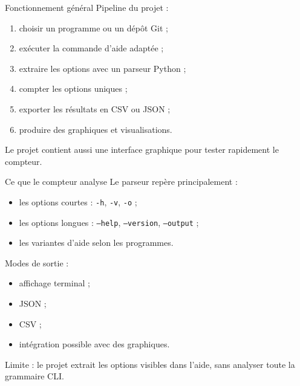 \documentclass[10pt,aspectratio=169]{beamer}
\begin{document}
\begin{frame}{Fonctionnement général}
  Pipeline du projet :

  \begin{enumerate}
    \item choisir un programme ou un dépôt Git ;
    \item exécuter la commande d'aide adaptée ;
    \item extraire les options avec un parseur Python ;
    \item compter les options uniques ;
    \item exporter les résultats en CSV ou JSON ;
    \item produire des graphiques et visualisations.
  \end{enumerate}

  \vspace{0.3cm}
  Le projet contient aussi une interface graphique pour tester rapidement le compteur.
\end{frame}

\begin{frame}{Ce que le compteur analyse}
  Le parseur repère principalement :

  \begin{itemize}
    \item les options courtes : \texttt{-h}, \texttt{-v}, \texttt{-o} ;
    \item les options longues : \texttt{--help}, \texttt{--version}, \texttt{--output} ;
    \item les variantes d'aide selon les programmes.
  \end{itemize}

  \vspace{0.3cm}
  Modes de sortie :
  \begin{itemize}
    \item affichage terminal ;
    \item JSON ;
    \item CSV ;
    \item intégration possible avec des graphiques.
  \end{itemize}

  \vspace{0.2cm}
  \alert{Limite :} le projet extrait les options visibles dans l'aide, sans analyser toute la grammaire CLI.
\end{frame}
\end{document}
